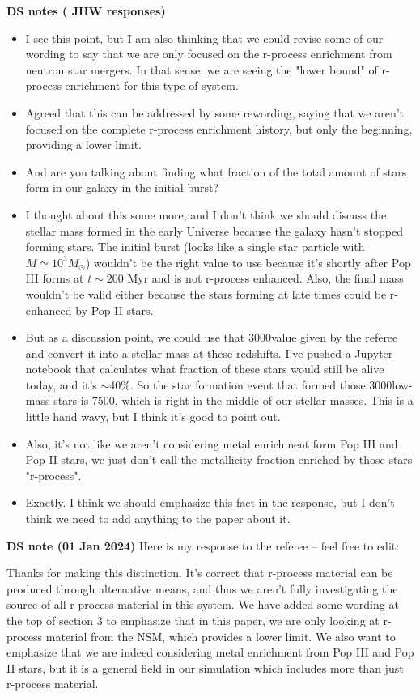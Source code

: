 \documentclass[11pt]{article}
\begin{document}
\noindent\textbf{DS notes {(\color{purple} JHW responses})}
\begin{itemize}
  \item I see this point, but I am also thinking that we could revise some of our wording to say that we are only focused on the r-process enrichment from neutron star mergers. In that sense, we are seeing the "lower bound" of r-process enrichment for this type of system.
  \item {\color{purple} Agreed that this can be addressed by some rewording, saying that we aren't focused on the complete r-process enrichment history, but only the beginning, providing a lower limit.}
  \item And are you talking about finding what fraction of the total amount of stars form in our galaxy in the initial burst? 
  \item {\color{purple} I thought about this some more, and I don't think we should discuss the stellar mass formed in the early Universe because the galaxy hasn't stopped forming stars.  The initial burst (looks like a single star particle with $M \simeq 10^3 M_\odot$) wouldn't be the right value to use because it's shortly after Pop III forms at $t \sim 200$ Myr and is not r-process enhanced.  Also, the final mass wouldn't be valid either because the stars forming at late times could be r-enhanced by Pop II stars.}
  \item {\color{purple} But as a discussion point, we could use that 3000\Ms value given by the referee and convert it into a stellar mass at these redshifts.  I've pushed a Jupyter notebook that calculates what fraction of these stars would still be alive today, and it's $\sim$40\%.  So the star formation event that formed those 3000\Ms low-mass stars is 7500\Ms, which is right in the middle of our stellar masses. This is a little hand wavy, but I think it's good to point out.}
  \item Also, it's not like we aren't considering metal enrichment form Pop III and Pop II stars, we just don't call the metallicity fraction enriched by those stars "r-process".
  \item {\color{purple} Exactly.  I think we should emphasize this fact in the response, but I don't think we need to add anything to the paper about it.}
\end{itemize}

\noindent\textbf{DS note (01 Jan 2024)}
Here is my response to the referee -- feel free to edit:

Thanks for making this distinction. It's correct that r-process material can be produced through alternative means, and thus we aren't fully investigating the source of all r-process material in this system. We have added some wording at the top of section 3 to emphasize that in this paper, we are only looking at r-process material from the NSM, which provides a lower limit. We also want to emphasize that we are indeed considering metal enrichment from Pop III and Pop II stars, but it is a general field in our simulation which includes more than just r-process material.
\end{document}
